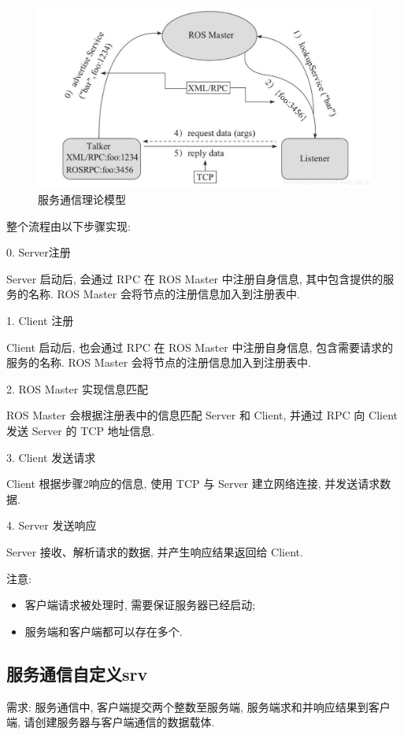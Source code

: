 \documentclass[openany, fontset=windowsold]{ctexbook}
\theoremstyle{kaiti}
\theoremstyle{normal}
\begin{document}
\begin{figure}[!ht]
  \centering
  \includegraphics[width=.75\textwidth]{ros_server_communication.jpg}
  \caption{服务通信理论模型}
  \label{fig:ros_server_communication}
\end{figure}

整个流程由以下步骤实现:

0. Server注册

Server 启动后, 会通过 RPC 在 ROS Master 中注册自身信息, 其中包含提供的服务的名称. ROS Master 会将节点的注册信息加入到注册表中.

1. Client 注册

Client 启动后, 也会通过 RPC 在 ROS Master 中注册自身信息, 包含需要请求的服务的名称. ROS Master 会将节点的注册信息加入到注册表中.

2. ROS Master 实现信息匹配

ROS Master 会根据注册表中的信息匹配 Server 和 Client, 并通过 RPC 向 Client 发送 Server 的 TCP 地址信息.

3. Client 发送请求

Client 根据步骤2响应的信息, 使用 TCP 与 Server 建立网络连接, 并发送请求数据.

4. Server 发送响应

Server 接收、解析请求的数据, 并产生响应结果返回给 Client.

注意:

\begin{itemize}
  \item 客户端请求被处理时, 需要保证服务器已经启动; 
  \item 服务端和客户端都可以存在多个.
\end{itemize}

\subsection{服务通信自定义srv}

需求: 服务通信中, 客户端提交两个整数至服务端, 服务端求和并响应结果到客户端, 请创建服务器与客户端通信的数据载体.
\end{document}
